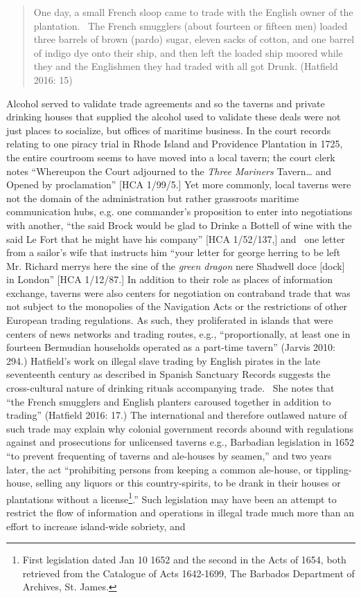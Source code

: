 \begin{quotation}
One day, a small French sloop came to trade with the English owner of the plantation. \ The French smugglers (about fourteen or fifteen men) loaded three barrels of brown (pardo) sugar, eleven sacks of cotton, and one barrel of indigo dye onto their ship, and then left the loaded ship moored while they and the Englishmen they had traded with all got Drunk. (Hatfield 2016: 15) 

\end{quotation}
\begin{styleStandard}
Alcohol served to validate trade agreements and so the taverns and private drinking houses that supplied the alcohol used to validate these deals were not just places to socialize, but offices of maritime business. In the court records relating to one piracy trial in Rhode Island and Providence Plantation in 1725, the entire courtroom seems to have moved into a local tavern; the court clerk notes “Whereupon the Court adjourned to the \textit{Three Mariners} Tavern… and Opened by proclamation” [HCA 1/99/5.] Yet more commonly, local taverns were not the domain of the administration but rather grassroots maritime communication hubs, e.g. one commander’s proposition to enter into negotiations with another, “the said Brock would be glad to Drinke a Bottell of wine with the said Le Fort that he might have his company” [HCA 1/52/137,] and \ one letter from a sailor’s wife that instructs him “your letter for george herring to be left Mr. Richard merrys here the sine of the \textit{green dragon} nere Shadwell doce [dock] in London” [HCA 1/12/87.] In addition to their role as places of information exchange, taverns were also centers for negotiation on contraband trade that was not subject to the monopolies of the Navigation Acts or the restrictions of other European trading regulations. As such, they proliferated in islands that were centers of news networks and trading routes, e.g., “proportionally, at least one in fourteen Bermudian households operated as a part-time tavern” (Jarvis 2010: 294.) Hatfield’s work on illegal slave trading by English pirates in the late seventeenth century as described in Spanish Sanctuary Records suggests the cross-cultural nature of drinking rituals accompanying trade. \ She notes that “the French smugglers and English planters caroused together in addition to trading” (Hatfield 2016: 17.) The international and therefore outlawed nature of such trade may explain why colonial government records abound with regulations against and prosecutions for unlicensed taverns e.g., Barbadian legislation in 1652 “to prevent frequenting of taverns and ale-houses by seamen,” and two years later, the act “prohibiting persons from keeping a common ale-house, or tippling-house, selling any liquors or this country-spirits, to be drank in their houses or plantations without a license\footnote{ First legislation dated Jan 10 1652 and the second in the Acts of 1654, both retrieved from the Catalogue of Acts 1642-1699, The Barbados Department of Archives, St. James.}.” Such legislation may have been an attempt to restrict the flow of information and operations in illegal trade much more than an effort to increase island-wide sobriety, and 
\end{styleStandard}
